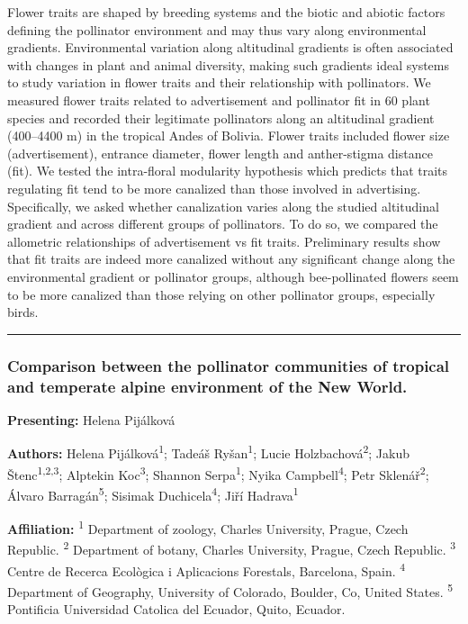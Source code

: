 \documentclass[
  letterpaper,
  DIV=11,
  numbers=noendperiod]{scrartcl}
\begin{document}
Flower traits are shaped by breeding systems and the biotic and abiotic
factors defining the pollinator environment and may thus vary along
environmental gradients. Environmental variation along altitudinal
gradients is often associated with changes in plant and animal
diversity, making such gradients ideal systems to study variation in
flower traits and their relationship with pollinators. We measured
flower traits related to advertisement and pollinator fit in 60 plant
species and recorded their legitimate pollinators along an altitudinal
gradient (400--4400 m) in the tropical Andes of Bolivia. Flower traits
included flower size (advertisement), entrance diameter, flower length
and anther-stigma distance (fit). We tested the intra-floral modularity
hypothesis which predicts that traits regulating fit tend to be more
canalized than those involved in advertising. Specifically, we asked
whether canalization varies along the studied altitudinal gradient and
across different groups of pollinators. To do so, we compared the
allometric relationships of advertisement vs fit traits. Preliminary
results show that fit traits are indeed more canalized without any
significant change along the environmental gradient or pollinator
groups, although bee-pollinated flowers seem to be more canalized than
those relying on other pollinator groups, especially birds.

\begin{center}\rule{0.5\linewidth}{0.5pt}\end{center}

\subsubsection{Comparison between the pollinator communities of tropical
and temperate alpine environment of the New
World.}\label{comparison-between-the-pollinator-communities-of-tropical-and-temperate-alpine-environment-of-the-new-world.}

\textbf{Presenting:} Helena Pijálková

\textbf{Authors:} Helena Pijálková\textsuperscript{1}; Tadeáš
Ryšan\textsuperscript{1}; Lucie Holzbachová\textsuperscript{2}; Jakub
Štenc\textsuperscript{1,2,3}; Alptekin Koc\textsuperscript{3}; Shannon
Serpa\textsuperscript{1}; Nyika Campbell\textsuperscript{4}; Petr
Sklenář\textsuperscript{2}; Álvaro Barragán\textsuperscript{5}; Sisimak
Duchicela\textsuperscript{4}; Jiří Hadrava\textsuperscript{1}

\textbf{Affiliation:} \textsuperscript{1} Department of zoology, Charles
University, Prague, Czech Republic. \textsuperscript{2} Department of
botany, Charles University, Prague, Czech Republic. \textsuperscript{3}
Centre de Recerca Ecològica i Aplicacions Forestals, Barcelona, Spain.
\textsuperscript{4} Department of Geography, University of Colorado,
Boulder, Co, United States. \textsuperscript{5} Pontificia Universidad
Catolica del Ecuador, Quito, Ecuador.
\end{document}

